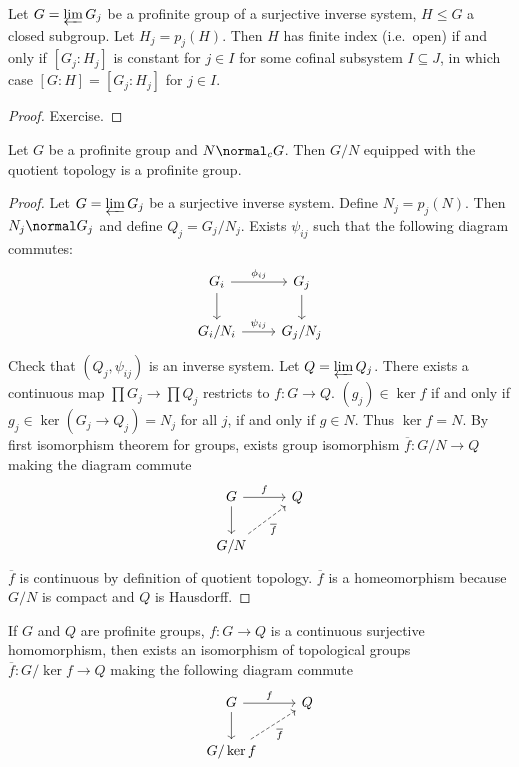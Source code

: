 \documentclass[a4paper]{article}
\begin{document}
\begin{proposition}
  Let \(G = \varprojlim G_j\) be a profinite group of a surjective inverse system, \(H \leq G\) a closed subgroup. Let \(H_j = p_j(H)\). Then \(H\) has finite index (i.e.\ open) if and only if \([G_j: H_j]\) is constant for \(j \in I\) for some cofinal subsystem \(I \subseteq J\), in which case \([G: H] = [G_j: H_j]\) for \(j \in I\).
\end{proposition}

\begin{proof}
  Exercise.
\end{proof}

\begin{proposition}
  Let \(G\) be a profinite group and \(N \normal_c G\). Then \(G/N\) equipped with the quotient topology is a profinite group.
\end{proposition}

\begin{proof}
  Let \(G = \varprojlim G_j\) be a surjective inverse system. Define \(N_j = p_j(N)\). Then \(N_j \normal G_j\) and define \(Q_j = G_j/N_j\). Exists \(\psi_{ij}\) such that the following diagram commutes:
  \[
    \begin{tikzcd}
      G_i \ar[r, "\phi_{ij}"] \ar[d] & G_j \ar[d] \\
      G_i/N_i \ar[r, "\psi_{ij}"] & G_j/N_j
    \end{tikzcd}
  \]
  Check that \((Q_j, \psi_{ij})\) is an inverse system. Let \(Q = \varprojlim Q_j\). There exists a continuous map \(\prod G_j \to \prod Q_j\) restricts to \(f: G \to Q\). \((g_j) \in \ker f\) if and only if \(g_j \in \ker (G_j \to Q_j) = N_j\) for all \(j\), if and only if \(g \in N\). Thus \(\ker f = N\). By first isomorphism theorem for groups, exists group isomorphism \(\overline f: G/N \to Q\) making the diagram commute
  \[
    \begin{tikzcd}
      G \ar[r, "f"] \ar[d] & Q \\
      G/N \ar[ur, "\overline f"', dashed]
    \end{tikzcd}
  \]
  \(\overline f\) is continuous by definition of quotient topology. \(\overline f\) is a homeomorphism because \(G/N\) is compact and \(Q\) is Hausdorff.
\end{proof}

\begin{theorem}
  If \(G\) and \(Q\) are profinite groups, \(f: G \to Q\) is a continuous surjective homomorphism, then exists an isomorphism of topological groups \(\overline f: G/\ker f \to Q\) making the following diagram commute
  \[
    \begin{tikzcd}
      G \ar[r, "f"] \ar[d] & Q \\
      G/\ker f \ar[ur, "\overline f"', dashed]
    \end{tikzcd}
  \]
\end{theorem}
\end{document}
